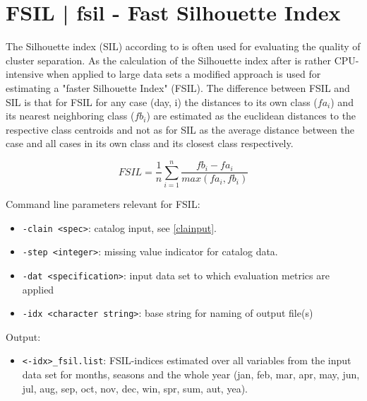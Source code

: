 \documentclass[12pt, oneside, a4paper, headsepline, plainheadsepline]{scrbook}
\begin{document}
\section{FSIL | fsil - Fast Silhouette Index}

The Silhouette index (SIL) according to  \citet{Rousseeuw1987} is often used for evaluating the quality of cluster separation. As the calculation of the Silhouette index after  \citet{Rousseeuw1987} is rather CPU-intensive when applied to large data sets a modified approach is used for estimating a "faster Silhouette Index" (FSIL). The difference between FSIL and SIL is that for FSIL for any case (day, i) the distances to its own class ($fa_i$) and its nearest neighboring class ($fb_i$) are estimated as the euclidean distances to the respective class centroids and not as for SIL as the average distance between the case and all cases in its own class and its closest class respectively.

\begin{equation}
FSIL = \frac{1}{n}     \displaystyle\sum_{i=1}^n  { \frac{fb_i - fa_i}{max(fa_i, fb_i)}}
\end{equation}

Command line parameters relevant for FSIL:
\begin{itemize}
\item \verb+-clain <spec>+:  catalog input, see \ref{clainput}.
\item \verb+-step <integer>+: missing value indicator for catalog data.
\item \verb+-dat <specification>+: input data set to which evaluation metrics are applied
\item  \verb+-idx <character string>+: base string for naming of output file(s)
\end{itemize}


Output:
\begin{itemize}
\item   \verb+<-idx>_fsil.list+: FSIL-indices estimated over all variables from the input data set for months, seasons and the whole year (jan, feb, mar, apr, may, jun, jul, aug, sep, oct, nov, dec, win, spr, sum, aut, yea).
\end{itemize}

\end{document}
